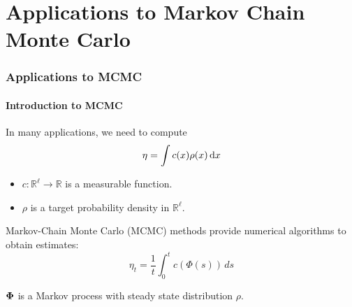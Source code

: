 \documentclass[xcolor=dvipsnames, subsection=false]{beamer}
\def\bfmath#1{{\mathchoice{\mbox{\boldmath$#1$}}%
{\mbox{\boldmath$#1$}}%
{\mbox{\boldmath$\scriptstyle#1$}}%
{\mbox{\boldmath$\scriptscriptstyle#1$}}}}
\def\bfPhi{\bfmath{\Phi}}
\newcommand{\field}[1]{\mathbb{#1}}
\def\Re{\field{R}}
\def\rmd{\,\textmd{d}}
\def\markovstate{\Phi}
\newcommand{\pr}{\rho}
\begin{document}

\section{Applications to Markov Chain Monte Carlo}
\begin{frame}
\frametitle{Applications to MCMC}
\framesubtitle{Introduction to MCMC}
In many applications, we need to compute
\begin{equation*}
\eta = \int c(x)\pr(x) \rmd x
\label{e:eta}
\end{equation*}
\begin{itemize}
	\item $c\colon\Re^\ell\to\Re$ is a measurable function.
	\item $\pr$ is a target probability density in $\Re^\ell$.
\end{itemize}
 Markov-Chain Monte Carlo (MCMC) methods provide numerical algorithms to obtain estimates:
	\[
	\eta_t =\frac{1}{t}\int_0^t c(\markovstate(s)) \, ds
	\label{e:sample_mean}
	\]
\begin{center}
	$\bfPhi$ is a Markov process with steady state distribution $\pr$.
\end{center}
\end{frame}
\end{document}
